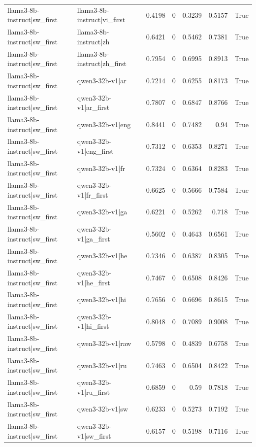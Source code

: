 \begin{table}
\begin{tabular}{l l r r r r l}
llama3-8b-instruct|sw_first & llama3-8b-instruct|vi_first & 0.4198 & 0 & 0.3239 & 0.5157 & True \\
llama3-8b-instruct|sw_first & llama3-8b-instruct|zh & 0.6421 & 0 & 0.5462 & 0.7381 & True \\
llama3-8b-instruct|sw_first & llama3-8b-instruct|zh_first & 0.7954 & 0 & 0.6995 & 0.8913 & True \\
llama3-8b-instruct|sw_first & qwen3-32b-v1|ar & 0.7214 & 0 & 0.6255 & 0.8173 & True \\
llama3-8b-instruct|sw_first & qwen3-32b-v1|ar_first & 0.7807 & 0 & 0.6847 & 0.8766 & True \\
llama3-8b-instruct|sw_first & qwen3-32b-v1|eng & 0.8441 & 0 & 0.7482 & 0.94 & True \\
llama3-8b-instruct|sw_first & qwen3-32b-v1|eng_first & 0.7312 & 0 & 0.6353 & 0.8271 & True \\
llama3-8b-instruct|sw_first & qwen3-32b-v1|fr & 0.7324 & 0 & 0.6364 & 0.8283 & True \\
llama3-8b-instruct|sw_first & qwen3-32b-v1|fr_first & 0.6625 & 0 & 0.5666 & 0.7584 & True \\
llama3-8b-instruct|sw_first & qwen3-32b-v1|ga & 0.6221 & 0 & 0.5262 & 0.718 & True \\
llama3-8b-instruct|sw_first & qwen3-32b-v1|ga_first & 0.5602 & 0 & 0.4643 & 0.6561 & True \\
llama3-8b-instruct|sw_first & qwen3-32b-v1|he & 0.7346 & 0 & 0.6387 & 0.8305 & True \\
llama3-8b-instruct|sw_first & qwen3-32b-v1|he_first & 0.7467 & 0 & 0.6508 & 0.8426 & True \\
llama3-8b-instruct|sw_first & qwen3-32b-v1|hi & 0.7656 & 0 & 0.6696 & 0.8615 & True \\
llama3-8b-instruct|sw_first & qwen3-32b-v1|hi_first & 0.8048 & 0 & 0.7089 & 0.9008 & True \\
llama3-8b-instruct|sw_first & qwen3-32b-v1|raw & 0.5798 & 0 & 0.4839 & 0.6758 & True \\
llama3-8b-instruct|sw_first & qwen3-32b-v1|ru & 0.7463 & 0 & 0.6504 & 0.8422 & True \\
llama3-8b-instruct|sw_first & qwen3-32b-v1|ru_first & 0.6859 & 0 & 0.59 & 0.7818 & True \\
llama3-8b-instruct|sw_first & qwen3-32b-v1|sw & 0.6233 & 0 & 0.5273 & 0.7192 & True \\
llama3-8b-instruct|sw_first & qwen3-32b-v1|sw_first & 0.6157 & 0 & 0.5198 & 0.7116 & True \\

\end{tabular}
\end{table}
